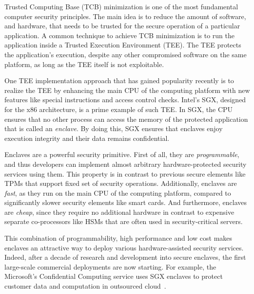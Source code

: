 
\vspace{10pt}

Trusted Computing Base (TCB) minimization is one of the most fundamental computer security principles. The main idea is to reduce the amount of software, and hardware, that needs to be trusted for the secure operation of a particular application. A common technique to achieve TCB minimization is to run the application inside a Trusted Execution Environment (TEE). The TEE protects the application's execution, despite any other compromised software on the same platform, as long as the TEE itself is not exploitable. 

One TEE implementation approach that has gained popularity recently is to realize the TEE by enhancing the main CPU of the computing platform with new features like special instructions and access control checks. Intel's SGX, designed for the x86 architecture, is a prime example of such TEE. In SGX, the CPU ensures that no other process can access the memory of the protected application that is called an \emph{enclave}. By doing this, SGX ensures that enclaves enjoy execution integrity and their data remains confidential.  

Enclaves are a powerful security primitive. First of all, they are \emph{programmable}, and thus developers can implement almost arbitrary hardware-protected security services using them. This property is in contrast to previous secure elements like TPMs that support fixed set of security operations. Additionally, enclaves are \emph{fast}, as they run on the main CPU of the computing platform, compared to significantly slower security elements like smart cards. And furthermore, enclaves are \emph{cheap}, since they require no additional hardware in contrast to expensive separate co-processors like HSMs that are often used in security-critical servers. 

This combination of programmability, high performance and low cost makes enclaves an attractive way to deploy various hardware-assisted security services. Indeed, after a decade of research and development into secure enclaves, the first large-scale commercial deployments are now starting. For example, the Microsoft's Confidential Computing service uses SGX enclaves to protect customer data and computation in outsourced cloud~\cite{russinovich2017introducing}.

